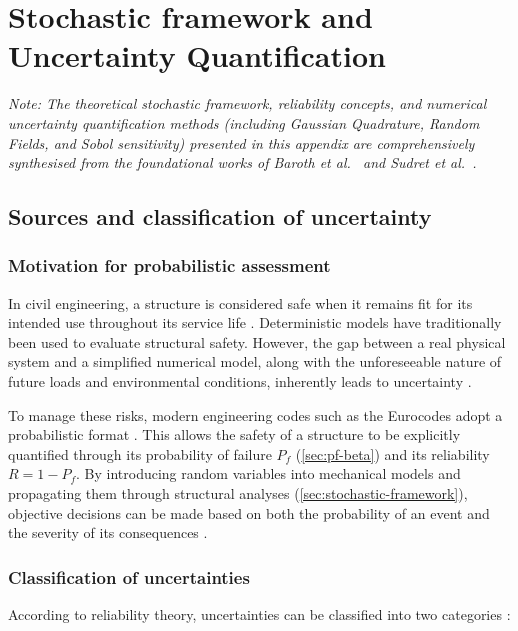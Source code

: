 \chapter{Stochastic framework and Uncertainty Quantification} \label{appendixB}
\textit{Note: The theoretical stochastic framework, reliability concepts, and numerical uncertainty quantification methods (including Gaussian Quadrature, Random Fields, and Sobol sensitivity) presented in this appendix are comprehensively synthesised from the foundational works of Baroth et al.~\cite{baroth2011, baroth2023} and Sudret et al.~\cite{sudret2000, sudret2003}.}

\section{Sources and classification of uncertainty} \label{sec:uncertainty-theory}

\subsection{Motivation for probabilistic assessment}

In civil engineering, a structure is considered safe when it remains fit for its intended use throughout its service life \cite{baroth2011}. Deterministic models have traditionally been used to evaluate structural safety. However, the gap between a real physical system and a simplified numerical model, along with the unforeseeable nature of future loads and environmental conditions, inherently leads to uncertainty \cite{baroth2023}.

To manage these risks, modern engineering codes such as the Eurocodes adopt a probabilistic format \cite{baroth2011}. This allows the safety of a structure to be explicitly quantified through its probability of failure $P_f$ (\cref{sec:pf-beta}) and its reliability $R = 1 - P_f$. By introducing random variables into mechanical models and propagating them through structural analyses (\cref{sec:stochastic-framework}), objective decisions can be made based on both the probability of an event and the severity of its consequences \cite{baroth2023}.

\subsection{Classification of uncertainties}

According to reliability theory, uncertainties can be classified into two categories \cite{baroth2011,baroth2023}:

